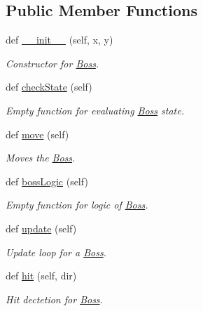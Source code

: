 \subsection*{Public Member Functions}
\begin{DoxyCompactItemize}
\item 
def \hyperlink{classactor_1_1boss_1_1_boss_a8aff9faf12326306058968f2e6424420}{\+\_\+\+\_\+init\+\_\+\+\_\+} (self, x, y)
\begin{DoxyCompactList}\small\item\em Constructor for \hyperlink{classactor_1_1boss_1_1_boss}{Boss}. \end{DoxyCompactList}\item 
\mbox{\label{classactor_1_1boss_1_1_boss_a5f510a5ea8387c4ccb1c5c36e54efa5d}} 
def \hyperlink{classactor_1_1boss_1_1_boss_a5f510a5ea8387c4ccb1c5c36e54efa5d}{check\+State} (self)
\begin{DoxyCompactList}\small\item\em Empty function for evaluating \hyperlink{classactor_1_1boss_1_1_boss}{Boss} state. \end{DoxyCompactList}\item 
def \hyperlink{classactor_1_1boss_1_1_boss_aa4ec284ad22d7c18bfa7116e4b2863cf}{move} (self)
\begin{DoxyCompactList}\small\item\em Moves the \hyperlink{classactor_1_1boss_1_1_boss}{Boss}. \end{DoxyCompactList}\item 
\mbox{\label{classactor_1_1boss_1_1_boss_a005977210760040c8af8f77972e068a0}} 
def \hyperlink{classactor_1_1boss_1_1_boss_a005977210760040c8af8f77972e068a0}{boss\+Logic} (self)
\begin{DoxyCompactList}\small\item\em Empty function for logic of \hyperlink{classactor_1_1boss_1_1_boss}{Boss}. \end{DoxyCompactList}\item 
def \hyperlink{classactor_1_1boss_1_1_boss_a0caeabbf20958679e55952559a2b74ee}{update} (self)
\begin{DoxyCompactList}\small\item\em Update loop for a \hyperlink{classactor_1_1boss_1_1_boss}{Boss}. \end{DoxyCompactList}\item 
def \hyperlink{classactor_1_1boss_1_1_boss_a6909e66b1a94f284ff34d2498a807c48}{hit} (self, dir)
\begin{DoxyCompactList}\small\item\em Hit dectetion for \hyperlink{classactor_1_1boss_1_1_boss}{Boss}. \end{DoxyCompactList}\end{DoxyCompactItemize}
